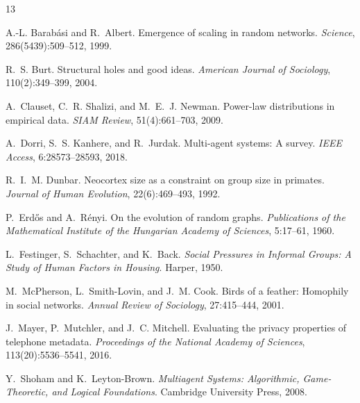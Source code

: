 \documentclass[11pt,twocolumn]{article}
\begin{document}
\begin{thebibliography}{13}

A.-L. Barab\'{a}si and R.~Albert.
\newblock Emergence of scaling in random networks.
\newblock \emph{Science}, 286(5439):509--512, 1999.

R.~S. Burt.
\newblock Structural holes and good ideas.
\newblock \emph{American Journal of Sociology}, 110(2):349--399, 2004.

A.~Clauset, C.~R. Shalizi, and M.~E.~J. Newman.
\newblock Power-law distributions in empirical data.
\newblock \emph{SIAM Review}, 51(4):661--703, 2009.

A.~Dorri, S.~S. Kanhere, and R.~Jurdak.
\newblock Multi-agent systems: A survey.
\newblock \emph{IEEE Access}, 6:28573--28593, 2018.

R.~I.~M. Dunbar.
\newblock Neocortex size as a constraint on group size in primates.
\newblock \emph{Journal of Human Evolution}, 22(6):469--493, 1992.

P.~Erd\H{o}s and A.~R\'{e}nyi.
\newblock On the evolution of random graphs.
\newblock \emph{Publications of the Mathematical Institute of the Hungarian Academy of Sciences}, 5:17--61, 1960.

L.~Festinger, S.~Schachter, and K.~Back.
\newblock \emph{Social Pressures in Informal Groups: A Study of Human Factors in Housing}.
\newblock Harper, 1950.

M.~McPherson, L.~Smith-Lovin, and J.~M. Cook.
\newblock Birds of a feather: Homophily in social networks.
\newblock \emph{Annual Review of Sociology}, 27:415--444, 2001.

J.~Mayer, P.~Mutchler, and J.~C. Mitchell.
\newblock Evaluating the privacy properties of telephone metadata.
\newblock \emph{Proceedings of the National Academy of Sciences}, 113(20):5536--5541, 2016.

Y.~Shoham and K.~Leyton-Brown.
\newblock \emph{Multiagent Systems: Algorithmic, Game-Theoretic, and Logical Foundations}.
\newblock Cambridge University Press, 2008.


\end{thebibliography}
\end{document}
